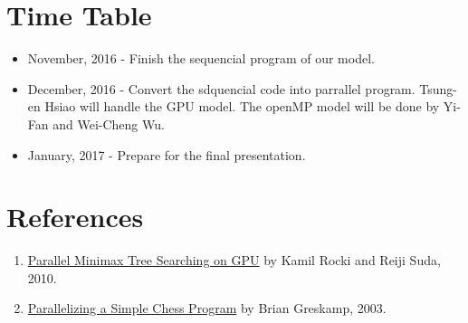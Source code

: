 \documentclass{sig-alternate-05-2015}
\begin{document}
\section{Time Table}
\begin{itemize}
    \item November, 2016 - Finish the sequencial program of our model.
    \item December, 2016 - Convert the sdquencial code into parrallel program. Tsung-en Hsiao will handle the GPU model. The openMP model will be done by Yi-Fan and Wei-Cheng Wu. 
    \item January, 2017 - Prepare for the final presentation.
\end{itemize}
\section{References}
\begin{enumerate}
    \item \href{http://olab.is.s.u-tokyo.ac.jp/~kamil.rocki/rocki_ppam09.pdf}{Parallel Minimax Tree Searching on GPU} by Kamil Rocki and Reiji Suda, 2010.
    \item \href{http://iacoma.cs.uiuc.edu/~greskamp/pdfs/412.pdf}{Parallelizing a Simple Chess Program} by Brian Greskamp, 2003.
\end{enumerate}
\end{document}
